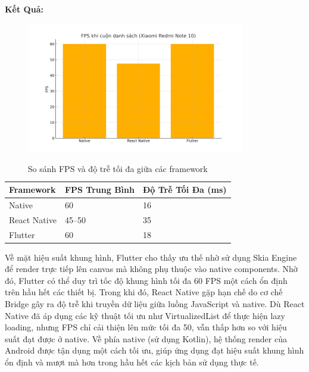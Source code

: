 \begin{flushleft}
  \hspace*{0.8cm}\textbf{Kết Quả:}
\end{flushleft}

\begin{figure}[H]
    \centering
    \includegraphics[width=0.85\textwidth]{images/performance_chart.png}
\end{figure}

\vspace{0.5em}

\begin{table}[H]
  \centering
  \begin{tabular}{|l|p{5cm}|p{5cm}|}
  \hline
  \textbf{Framework} & \textbf{FPS Trung Bình} & \textbf{Độ Trễ Tối Đa (ms)} \\
  \hline
  Native       & 60          & 16 \\
  React Native & 45--50      & 35 \\
  Flutter      & 60          & 18 \\
  \hline
  \end{tabular}
  \caption{So sánh FPS và độ trễ tối đa giữa các framework}
  \end{table}
  
  \begin{flushleft}
    \hspace*{0.8cm}Về mặt hiệu suất khung hình, Flutter cho thấy ưu thế nhờ sử dụng Skia Engine để render trực tiếp lên canvas mà không phụ thuộc vào native components. Nhờ đó, Flutter có thể duy trì tốc độ khung hình tối đa 60 FPS một cách ổn định trên hầu hết các thiết bị. Trong khi đó, React Native gặp hạn chế do cơ chế Bridge gây ra độ trễ khi truyền dữ liệu giữa luồng JavaScript và native. Dù React Native đã áp dụng các kỹ thuật tối ưu như VirtualizedList để thực hiện lazy loading, nhưng FPS chỉ cải thiện lên mức tối đa 50, vẫn thấp hơn so với hiệu suất đạt được ở native. Về phía native (sử dụng Kotlin), hệ thống render của Android được tận dụng một cách tối ưu, giúp ứng dụng đạt hiệu suất khung hình ổn định và mượt mà hơn trong hầu hết các kịch bản sử dụng thực tế.
  \end{flushleft}
  

